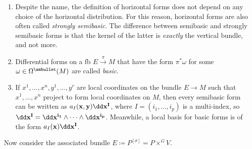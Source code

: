 \begin{rem}
    \begin{enumerate}
        \item Despite the name, the definition of horizontal forms does not depend on any choice of the horizontal distribution. For this reason, horizontal forms are also often called \emph{strongly semibasic}. The difference between semibasic and strongly semibasic forms is that the kernel of the latter is \emph{exactly} the vertical bundle, and not more.
        \item Differential forms on a \gls{fb} $E\overset{\pi}{\to} M$ that have the form $\pi^\ast\omega $ for some $\omega\in \Omega^{\smbullet}(M)$ are called \emph{basic}.
        \item If $x^1,\ldots,x^n,y^1,\ldots,y^r$ are local coordinates on the bundle $E\to M$ such that $x^1,\ldots,x^n$ project to form local coordinates on $M$, then every semibasic form can be written as $a_I(\bf{x},\bf{y})\dd \bf{x}^I$, where $I=(i_1,\ldots,i_p)$ is a multi-index, so $\dd \bf{x}^I=\dd x^{i_1}\wedge\cdots\wedge\dd x^{i_p}$. Meanwhile, a local basis for basic forms is of the form $a_I(\bf{x})\dd \bf{x}^I$.
    \end{enumerate}
\end{rem}

Now consider the associated bundle $E\coloneqq P^{[\sigma]}=P\times^G V$.

